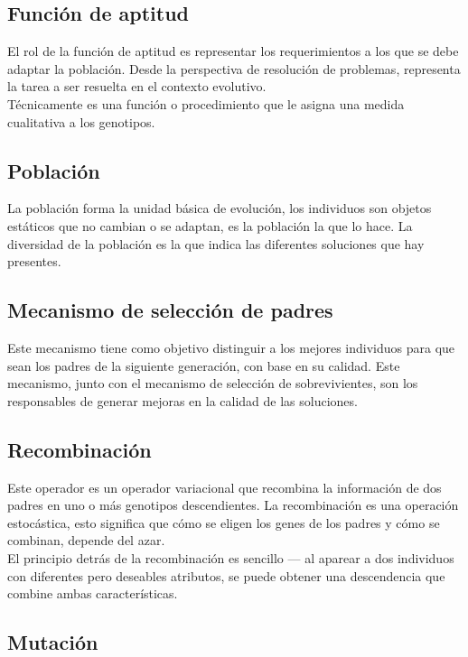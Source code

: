 \subsection{Función de aptitud}

El rol de la función de aptitud es representar los requerimientos a los que se debe adaptar la población. Desde la perspectiva de resolución de problemas, representa la tarea a ser resuelta en el contexto evolutivo.
\\

Técnicamente  es una función o procedimiento que le asigna una medida cualitativa a los genotipos.

\subsection{Población}

La población forma la unidad básica de evolución, los individuos son objetos estáticos que no cambian o se adaptan, es la población la que lo hace. La diversidad de la población es la que indica las diferentes soluciones que hay presentes.

\subsection{Mecanismo de selección de padres}

Este mecanismo tiene como objetivo distinguir a los mejores individuos para que sean los padres de la siguiente generación, con base en su calidad. Este mecanismo, junto con el mecanismo de selección de sobrevivientes, son los responsables de generar mejoras en la calidad de las soluciones.

\subsection{Recombinación}

Este operador es un operador variacional que recombina la información de dos padres en uno o más genotipos descendientes. La recombinación es una operación estocástica, esto significa que cómo se eligen los genes de los padres y cómo se combinan, depende del azar.
\\

El principio detrás de la recombinación es sencillo --- al aparear a dos individuos con diferentes pero deseables atributos, se puede obtener una descendencia que combine ambas características. 

\subsection{Mutación}


